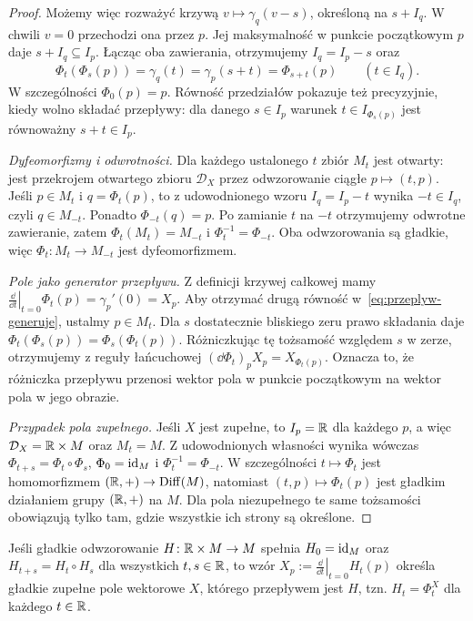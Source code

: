 \begin{proof}
Możemy więc rozważyć krzywą
$v\mapsto\gamma_q(v-s)$, określoną na $s+I_q$.
W chwili $v=0$ przechodzi ona przez $p$. Jej maksymalność
w punkcie początkowym $p$ daje $s+I_q\subseteq I_p$.
Łącząc oba zawierania, otrzymujemy $I_q=I_p-s$ oraz
\[
\Phi_t(\Phi_s(p))=\gamma_q(t)=\gamma_p(s+t)=\Phi_{s+t}(p)
\qquad (t\in I_q).
\]
W szczególności $\Phi_0(p)=p$.
Równość przedziałów pokazuje też precyzyjnie, kiedy wolno
składać przepływy: dla danego $s\in I_p$ warunek
$t\in I_{\Phi_s(p)}$ jest równoważny $s+t\in I_p$.

\medskip
\noindent\emph{Dyfeomorfizmy i odwrotności.}
Dla każdego ustalonego $t$ zbiór $M_t$ jest otwarty:
jest przekrojem otwartego zbioru $\mathcal D_X$
przez odwzorowanie ciągłe $p\mapsto(t,p)$.
Jeśli $p\in M_t$ i $q=\Phi_t(p)$, to z udowodnionego wzoru
$I_q=I_p-t$ wynika $-t\in I_q$, czyli $q\in M_{-t}$.
Ponadto $\Phi_{-t}(q)=p$. Po zamianie $t$ na $-t$
otrzymujemy odwrotne zawieranie, zatem
$\Phi_t(M_t)=M_{-t}$ i
$\Phi_t^{-1}=\Phi_{-t}$. Oba odwzorowania są gładkie,
więc $\Phi_t\colon M_t\to M_{-t}$ jest dyfeomorfizmem.

\medskip
\noindent\emph{Pole jako generator przepływu.}
Z definicji krzywej całkowej mamy
$\left.\frac{\dd}{\dd t}\right|_{t=0}\Phi_t(p)
=\gamma_p'(0)=X_p$.
Aby otrzymać drugą równość w~\eqref{eq:przeplyw-generuje},
ustalmy $p\in M_t$. Dla $s$ dostatecznie bliskiego zeru
prawo składania daje
$\Phi_t(\Phi_s(p))=\Phi_s(\Phi_t(p))$.
Różniczkując tę tożsamość względem $s$ w zerze,
otrzymujemy z reguły łańcuchowej
$(\dd\Phi_t)_pX_p=X_{\Phi_t(p)}$.
Oznacza to, że różniczka przepływu przenosi wektor pola
w punkcie początkowym na wektor pola w jego obrazie.

\medskip
\noindent\emph{Przypadek pola zupełnego.}
Jeśli $X$ jest zupełne, to $I_p=\mathbb{R}$ dla każdego $p$,
a więc $\mathcal D_X=\mathbb{R}\times M$ oraz $M_t=M$.
Z udowodnionych własności wynika wówczas
$\Phi_{t+s}=\Phi_t\circ\Phi_s$,
$\Phi_0=\mathrm{id}_M$ i $\Phi_t^{-1}=\Phi_{-t}$.
W szczególności $t\mapsto\Phi_t$ jest homomorfizmem
$(\mathbb{R},+)\to\operatorname{Diff}(M)$, natomiast
$(t,p)\mapsto\Phi_t(p)$ jest gładkim działaniem grupy
$(\mathbb{R},+)$ na $M$. Dla pola niezupełnego te same tożsamości
obowiązują tylko tam, gdzie wszystkie ich strony są określone.
\end{proof}

\begin{stwierdzenie}
Jeśli gładkie odwzorowanie $H\colon\mathbb{R}\times M\to M$ spełnia
$H_0=\mathrm{id}_M$ oraz $H_{t+s}=H_t\circ H_s$ dla wszystkich
$t,s\in\mathbb{R}$, to wzór
$X_p:=\left.\frac{\dd}{\dd t}\right|_{t=0}H_t(p)$
określa gładkie zupełne pole wektorowe $X$, którego
przepływem jest $H$, tzn. $H_t=\Phi_t^X$ dla każdego $t\in\mathbb{R}$.
\end{stwierdzenie}

